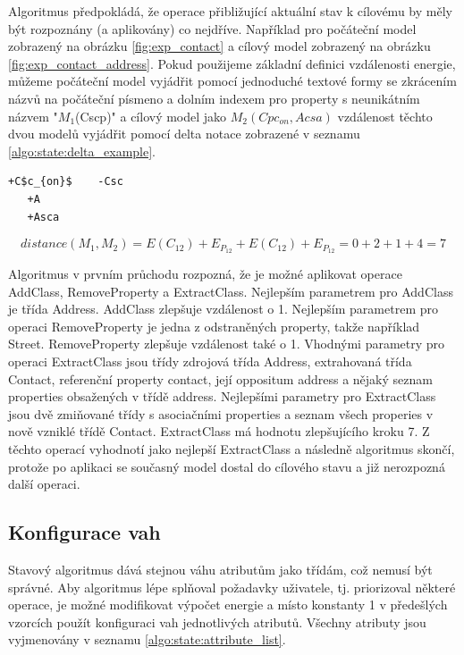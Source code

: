 \documentclass[11pt,twoside,a4paper]{book}
\begin{document}
\FloatBarrier

Algoritmus předpokládá, že operace přibližující aktuální stav k cílovému by
měly být rozpoznány (a aplikovány) co nejdříve. Například pro počáteční model
zobrazený na obrázku \ref{fig:exp_contact} a cílový model zobrazený na obrázku
\ref{fig:exp_contact_address}. 
Pokud použijeme základní definici vzdálenosti energie, můžeme
počáteční model vyjádřit pomocí jednoduché textové formy se
zkrácením názvů na počáteční písmeno a dolním indexem pro
property s neunikátním názvem "$M_1$(Cscp)" a cílový model jako $M_2(Cpc_{on},
Acsa)$ vzdálenost těchto dvou modelů vyjádřit pomocí
 delta notace zobrazené v seznamu \ref{algo:state:delta_example}.
 
\begin{lstlisting}[mathescape,frame=single,caption=Textový patch
modelů pro ukázkový příklad v delta notaci,label=algo:state:delta_example]
   +C$c_{on}$    -Csc
   +A            
   +Asca
\end{lstlisting}


$$distance(M_1,M_2) = E(C_{12}) + E_{P_{12}} + E(C_{12})
+ E_{P_{12}} = 0 + 2 + 1 + 4 = 7$$

Algoritmus v prvním průchodu rozpozná, že je možné aplikovat operace
AddClass, RemoveProperty a ExtractClass. Nejlepším parametrem pro AddClass je
třída Address. AddClass zlepšuje vzdálenost o 1. Nejlepším parametrem pro
operaci RemoveProperty je jedna z odstraněných property, takže například
Street. RemoveProperty zlepšuje vzdálenost také o 1. Vhodnými
parametry pro operaci ExtractClass jsou třídy zdrojová třída Address,
extrahovaná třída Contact, referenční property contact, její oppositum address a
nějaký seznam properties obsažených v třídě address.
Nejlepšími parametry pro ExtractClass jsou dvě zmiňované třídy s asociačními
properties a seznam všech properies v nově vzniklé třídě Contact. ExtractClass
má hodnotu zlepšujícího kroku 7. Z těchto operací vyhodnotí jako nejlepší
ExtractClass a následně algoritmus skončí, protože po aplikaci se současný
model dostal do cílového stavu a již nerozpozná další operaci.


\subsection{Konfigurace vah}
Stavový algoritmus dává stejnou váhu atributům jako třídám, což nemusí být
správné. Aby algoritmus lépe splňoval požadavky uživatele, tj. priorizoval
některé operace, je možné modifikovat výpočet energie a místo konstanty 1 v
předešlých vzorcích použít konfiguraci vah jednotlivých atributů.
Všechny atributy jsou vyjmenovány v seznamu \ref{algo:state:attribute_list}.
\end{document}
